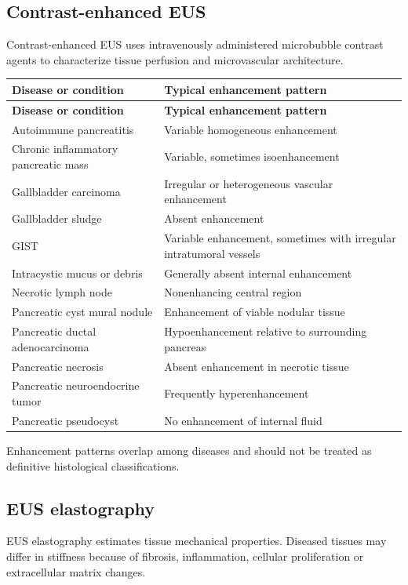 \subsection{Contrast-enhanced EUS}
Contrast-enhanced EUS uses intravenously administered microbubble contrast agents to characterize tissue perfusion and microvascular architecture.

\begin{longtable}{@{}p{}p{}@{}}
\toprule
\textbf{Disease or condition} & \textbf{Typical enhancement pattern} \\
\midrule
\endfirsthead
\toprule
\textbf{Disease or condition} & \textbf{Typical enhancement pattern} \\
\midrule
\endhead
Autoimmune pancreatitis & Variable homogeneous enhancement \\
Chronic inflammatory pancreatic mass & Variable, sometimes isoenhancement \\
Gallbladder carcinoma & Irregular or heterogeneous vascular enhancement \\
Gallbladder sludge & Absent enhancement \\
GIST & Variable enhancement, sometimes with irregular intratumoral vessels \\
Intracystic mucus or debris & Generally absent internal enhancement \\
Necrotic lymph node & Nonenhancing central region \\
Pancreatic cyst mural nodule & Enhancement of viable nodular tissue \\
Pancreatic ductal adenocarcinoma & Hypoenhancement relative to surrounding pancreas \\
Pancreatic necrosis & Absent enhancement in necrotic tissue \\
Pancreatic neuroendocrine tumor & Frequently hyperenhancement \\
Pancreatic pseudocyst & No enhancement of internal fluid \\
\bottomrule
\end{longtable}
Enhancement patterns overlap among diseases and should not be treated as definitive histological classifications.

\subsection{EUS elastography}
EUS elastography estimates tissue mechanical properties. Diseased tissues may differ in stiffness because of fibrosis, inflammation, cellular proliferation or extracellular matrix changes.

